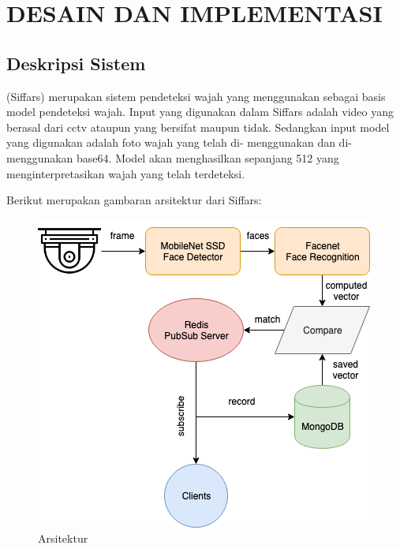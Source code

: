 \chapter{DESAIN DAN IMPLEMENTASI}


\section{Deskripsi Sistem}

 (Siffars) merupakan sistem pendeteksi wajah yang menggunakan  sebagai basis model pendeteksi wajah.
Input yang digunakan dalam Siffars adalah video yang berasal dari cctv ataupun  yang bersifat  maupun tidak. 
Sedangkan input model  yang digunakan adalah foto wajah yang telah di-  menggunakan  dan di-  menggunakan base64.
Model  akan menghasilkan  sepanjang 512 yang menginterpretasikan wajah yang telah terdeteksi.

Berikut merupakan gambaran arsitektur dari Siffars:

\begin{figure} [ht] \centering
  \includegraphics[scale=0.4]{gambar/sfa.png}
  \caption{Arsitektur }
  \label{fig:SpaceShuttle}
\end{figure}

